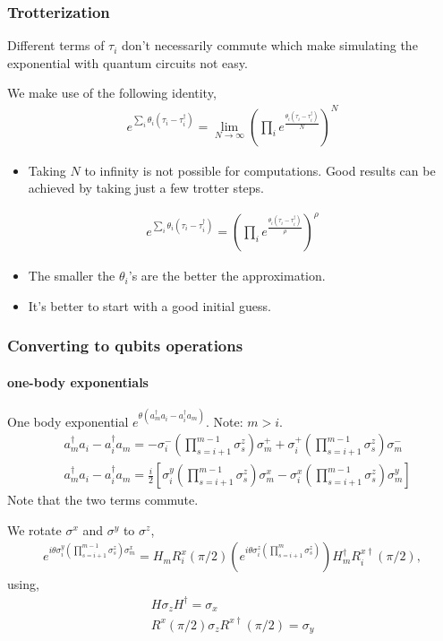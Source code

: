 \documentclass{beamer}
\renewcommand{\(}{\left(}
\renewcommand{\)}{\right)}
\renewcommand{\[}{\left[}
\renewcommand{\]}{\right]}
\begin{document}
\begin{frame}
    \frametitle{Trotterization}
    Different terms of $\tau_i$ don't necessarily commute which make simulating the exponential with quantum circuits not easy. 

    We make use of the following identity,
    \begin{align*}
        e^{\sum_i \theta_i (\tau_i - \tau^\dagger_i)} = \lim_{N \rightarrow \infty}\(\prod_i e^{\frac{\theta_i (\tau_i - \tau_i^\dagger)}{N}}\)^N
    \end{align*}
    \pause
    \begin{itemize}
        \item Taking $N$ to infinity is not possible for computations. Good results can be achieved by taking just a few trotter steps.
    \end{itemize}
    \begin{align*}
        e^{\sum_i \theta_i (\tau_i - \tau^\dagger_i)} = \(\prod_i e^{\frac{\theta_i (\tau_i - \tau_i^\dagger)}{\rho}}\)^\rho
    \end{align*}
    \begin{itemize}
        \item The smaller the $\theta_i$'s are the better the approximation.
        \item It's better to start with a good initial guess. 
    \end{itemize}
    
\end{frame}

\begin{frame}
    \frametitle{Converting to qubits operations}
    \framesubtitle{one-body exponentials}

    One body exponential $e^{\theta (a^\dagger_m a_i - a^\dagger_i a_m )}$. Note: $m>i.$ 
    \begin{align*}
        &a^\dagger_m a_i - a^\dagger_i a_m = -\sigma^{-}_i \(\prod_{s=i+1}^{m-1} \sigma_s^z\) \sigma^{+}_m  + \sigma^{+}_i  \(\prod_{s=i+1}^{m-1} \sigma_s^z\) \sigma^{-}_m \\
        &a^\dagger_m a_i - a^\dagger_i a_m = \frac{i}{2} \[ \sigma^{y}_i \(\prod_{s=i+1}^{m-1} \sigma_s^z\) \sigma^{x}_m  - \sigma^{x}_i \(\prod_{s=i+1}^{m-1} \sigma_s^z\) \sigma^{y}_m \]
    \end{align*}
    Note that the two terms commute. 
    \pause

    We rotate $\sigma^x$ and $\sigma^y$ to $\sigma^{z}$,
    \begin{align*}
        e^{i\theta \sigma^{y}_i \(\prod_{s=i+1}^{m-1} \sigma_s^z\) \sigma^{x}_m}  = H_m R^x_i(\pi/2)\(e^{i\theta \sigma^{z}_i \(\prod_{s=i+1}^{m} \sigma_s^z\) } \)H^\dagger_m R^{x\dagger}_i(\pi/2), 
    \end{align*}
    using,
    \begin{gather*}
        H \sigma_z H^\dagger  = \sigma_x \\ 
        R^x\(\pi/2\) \sigma_z R^{x\dagger}\(\pi/2\)  = \sigma_y 
    \end{gather*}
\end{frame}
\end{document}
